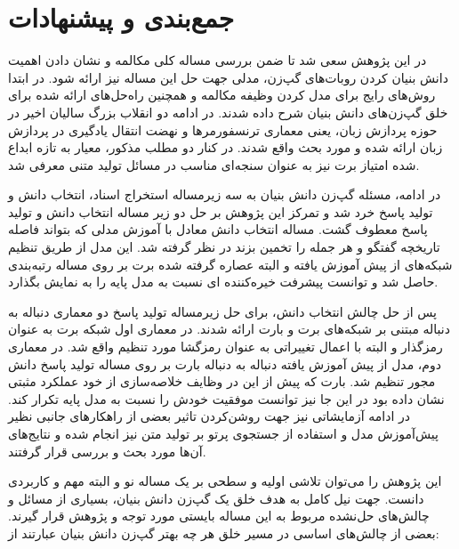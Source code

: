 \chapter{جمع‌بندی و پیشنهادات}\label{Chap6}

در این پژوهش سعی شد تا ضمن بررسی مساله کلی مکالمه و نشان دادن اهمیت دانش بنیان کردن روبات‌های گپ‌زن،‌ مدلی جهت حل این مساله نیز ارائه شود. 
در ابتدا روش‌های رایج برای مدل کردن وظیفه مکالمه و همچنین راه‌حل‌های ارائه شده برای خلق گپ‌زن‌های دانش بنیان شرح داده شدند. در ادامه دو انقلاب بزرگ سالیان اخیر در حوزه پردازش زبان، یعنی معماری ترنسفورمر‌ها و نهضت انتقال یادگیری در پردازش زبان ارائه شده و مورد بحث واقع شدند. در کنار دو مطلب مذکور، معیار به تازه ابداع شده امتیاز برت نیز به عنوان سنجه‌ای مناسب در مسائل تولید متنی معرفی شد. 

در ادامه، مسئله گپ‌زن دانش بنیان به سه زیرمساله استخراج اسناد،‌ انتخاب دانش و تولید پاسخ خرد شد و تمرکز این پژوهش بر حل دو زیر مساله انتخاب دانش و تولید پاسخ معطوف گشت. مساله انتخاب دانش معادل با آموزش مدلی که بتواند فاصله تاریخچه گفتگو و هر جمله را تخمین بزند در نظر گرفته شد. این مدل از طریق تنظیم شبکه‌های از پیش آموزش یافته و البته عصاره گرفته شده برت بر روی مساله رتبه‌بندی حاصل شد و توانست پیشرفت خیره‌کننده ای نسبت به مدل پایه را به نمایش بگذارد. 

پس از حل چالش انتخاب دانش، برای حل زیرمساله تولید پاسخ دو معماری دنباله به دنباله
مبتنی بر شبکه‌های برت و بارت ارائه شدند. در معماری اول شبکه برت به عنوان رمزگذار و البته با اعمال تغییراتی به عنوان رمزگشا مورد تنظیم واقع شد. در معماری دوم، مدل از پیش آموزش یافته دنباله به دنباله بارت بر روی مساله تولید پاسخ دانش مجور تنظیم شد. بارت که پیش از این در وظایف خلاصه‌سازی از خود عملکرد مثبتی نشان داده بود در این جا نیز توانست موفقیت خودش را نسبت به مدل پایه تکرار کند. در ادامه آزمایشاتی نیز جهت روشن‌کردن تاثیر بعضی از راهکار‌های جانبی نظیر پیش‌آموزش مدل و استفاده از جستجوی پرتو بر تولید متن نیز انجام شده و نتایج‌های آن‌ها مورد بحث و بررسی قرار گرفتند. 

این پژوهش را می‌توان تلاشی اولیه و سطحی بر یک مساله نو و البته مهم و کاربردی دانست. جهت نیل کامل به هدف خلق یک گپ‌زن دانش بنیان، بسیاری از مسائل و چالش‌‌های حل‌نشده مربوط به این مساله بایستی مورد توجه و پژوهش قرار گیرند. بعضی از چالش‌های اساسی در مسیر خلق هر چه بهتر گپ‌زن دانش بنیان عبارتند از:

